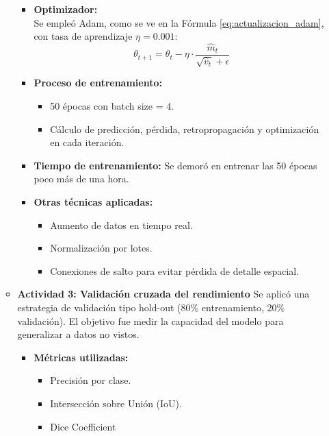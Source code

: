 \begin{enumerate}
\begin{itemize}
\begin{itemize}
  \item \textbf{Optimizador:} \\
  Se empleó Adam, como se ve en la Fórmula \ref{eq:actualizacion_adam}, con tasa de aprendizaje $\eta = 0.001$:
  \begin{equation}\label{eq:actualizacion_adam}
    \theta_{t+1} = \theta_t - \eta \cdot \frac{\hat{m}_t}{\sqrt{\hat{v}_t} + \epsilon}
\end{equation}

  \item \textbf{Proceso de entrenamiento:}
  \begin{itemize}
    \item 50 épocas con batch size = 4.
    \item Cálculo de predicción, pérdida, retropropagación y optimización en cada iteración.
  \end{itemize}

  \item \textbf{Tiempo de entrenamiento:}
  Se demoró en entrenar las 50 épocas poco más de una hora.

  \item \textbf{Otras técnicas aplicadas:}
  \begin{itemize}
    \item Aumento de datos en tiempo real.
    \item Normalización por lotes.
    \item Conexiones de salto para evitar pérdida de detalle espacial.
  \end{itemize}
\end{itemize}

\vspace{0.5cm}


  \item\textbf{Actividad 3: Validación cruzada del rendimiento}
  Se aplicó una estrategia de validación tipo hold-out (80\% entrenamiento, 20\% validación). El objetivo fue medir la capacidad del modelo para generalizar a datos no vistos.

\begin{itemize}
  \item \textbf{Métricas utilizadas:}
  \begin{itemize}
    \item Precisión por clase.
    \item Intersección sobre Unión (IoU).
    \item Dice Coefficient
  \end{itemize}


\end{itemize}
\end{itemize}
\end{enumerate}
